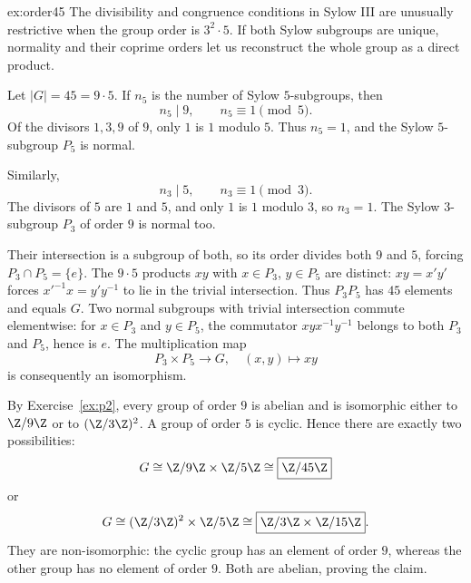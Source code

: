 \begin{solution}{ex:order45}
\idea The divisibility and congruence conditions in Sylow III are unusually restrictive when the group order is $3^2\cdot5$. If both Sylow subgroups are unique, normality and their coprime orders let us reconstruct the whole group as a direct product.

\writeup Let $|G|=45=9\cdot5$. If $n_5$ is the number of Sylow $5$-subgroups, then
\[
n_5\mid9,\qquad n_5\equiv1\pmod5.
\]
Of the divisors $1,3,9$ of $9$, only $1$ is $1$ modulo $5$. Thus $n_5=1$, and the Sylow $5$-subgroup $P_5$ is normal.

Similarly,
\[
n_3\mid5,\qquad n_3\equiv1\pmod3.
\]
The divisors of $5$ are $1$ and $5$, and only $1$ is $1$ modulo $3$, so $n_3=1$. The Sylow $3$-subgroup $P_3$ of order $9$ is normal too.

Their intersection is a subgroup of both, so its order divides both $9$ and $5$, forcing $P_3\cap P_5=\{e\}$. The $9\cdot5$ products $xy$ with $x\in P_3$, $y\in P_5$ are distinct: $xy=x'y'$ forces $x'^{-1}x=y'y^{-1}$ to lie in the trivial intersection. Thus $P_3P_5$ has $45$ elements and equals $G$. Two normal subgroups with trivial intersection commute elementwise: for $x\in P_3$ and $y\in P_5$, the commutator $xyx^{-1}y^{-1}$ belongs to both $P_3$ and $P_5$, hence is $e$. The multiplication map
\[
P_3\times P_5\longrightarrow G,\quad(x,y)\mapsto xy
\]
is consequently an isomorphism.

By Exercise~\ref{ex:p2}, every group of order $9$ is abelian and is isomorphic either to $\Z/9\Z$ or to $(\Z/3\Z)^2$. A group of order $5$ is cyclic. Hence there are exactly two possibilities:
\[
G\cong\Z/9\Z\times\Z/5\Z\cong\boxed{\Z/45\Z}
\]
or
\[
G\cong(\Z/3\Z)^2\times\Z/5\Z
\cong\boxed{\Z/3\Z\times\Z/15\Z}.
\]
They are non-isomorphic: the cyclic group has an element of order $9$, whereas the other group has no element of order $9$. Both are abelian, proving the claim.
\end{solution}

